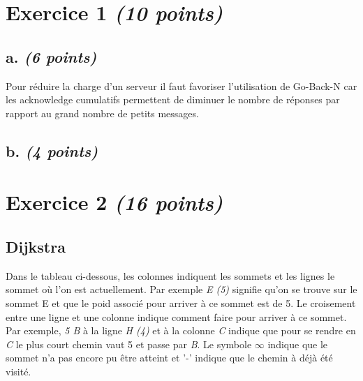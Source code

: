 \documentclass{article}
\begin{document}
\section{Exercice 1 \emph{(10 points)}}

\subsection{a. \emph{(6 points)}} %

Pour réduire la charge d'un serveur il faut favoriser l'utilisation de Go-Back-N car les acknowledge cumulatifs permettent de diminuer le nombre de réponses par rapport au grand nombre de petits messages.

\subsection{b. \emph{(4 points)}}

\clearpage

\section{Exercice 2 \emph{(16 points)}}

\subsection{Dijkstra}

Dans le tableau ci-dessous, les colonnes indiquent les sommets et les lignes le sommet où l'on est actuellement. Par exemple \emph{E (5)} signifie qu'on se trouve sur le sommet E et que le poid associé pour arriver à ce sommet est de 5. Le croisement entre une ligne et une colonne indique comment faire pour arriver à ce sommet. Par exemple, \emph{5 B} à la ligne \emph{H (4)} et à la colonne \emph{C} indique que pour se rendre en \emph{C} le plus court chemin vaut 5 et passe par \emph{B}. Le symbole $\infty$ indique que le sommet n'a pas encore pu être atteint et '-' indique que le chemin à déjà été visité. 

\hfill
\end{document}
